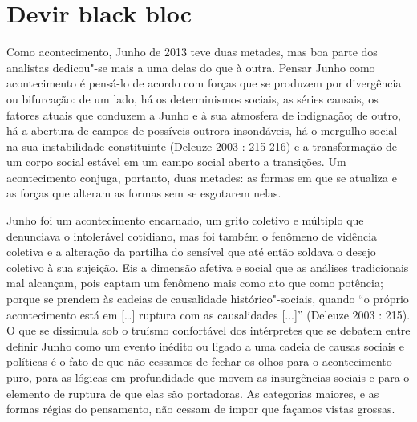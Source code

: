\chapter{Devir black bloc}


Como acontecimento, Junho de 2013 teve duas metades, mas boa parte dos
analistas dedicou"-se mais a uma delas do que à outra. Pensar Junho como
acontecimento é pensá-lo de acordo com forças que se produzem por
divergência ou bifurcação: de um lado, há os determinismos sociais, as
séries causais, os fatores atuais que conduzem a Junho e à sua atmosfera
de indignação; de outro, há a abertura de campos de possíveis outrora
insondáveis, há o mergulho social na sua instabilidade constituinte
(Deleuze 2003 : 215-216) e a transformação de um corpo social estável em
um campo social aberto a transições. Um acontecimento conjuga, portanto,
duas metades: as formas em que se atualiza e as forças que alteram as
formas sem se esgotarem nelas.

Junho foi um acontecimento encarnado, um grito coletivo e múltiplo que
denunciava o intolerável cotidiano, mas foi também o fenômeno de
vidência coletiva e a alteração da partilha do sensível que até então
soldava o desejo coletivo à sua sujeição. Eis a dimensão afetiva e
social que as análises tradicionais mal alcançam, pois captam um
fenômeno mais como ato que como potência; porque se prendem às cadeias
de causalidade histórico"-sociais, quando ``o próprio acontecimento está
em {[}\ldots{}{]} ruptura com as causalidades {[}...{]}'' (Deleuze 2003
: 215). O que se dissimula sob o truísmo confortável dos intérpretes que
se debatem entre definir Junho como um evento inédito ou ligado a uma
cadeia de causas sociais e políticas é o fato de que não cessamos de
fechar os olhos para o acontecimento puro, para as lógicas em
profundidade que movem as insurgências sociais e para o elemento de
ruptura de que elas são portadoras. As categorias maiores, e as formas
régias do pensamento, não cessam de impor que façamos vistas grossas.

